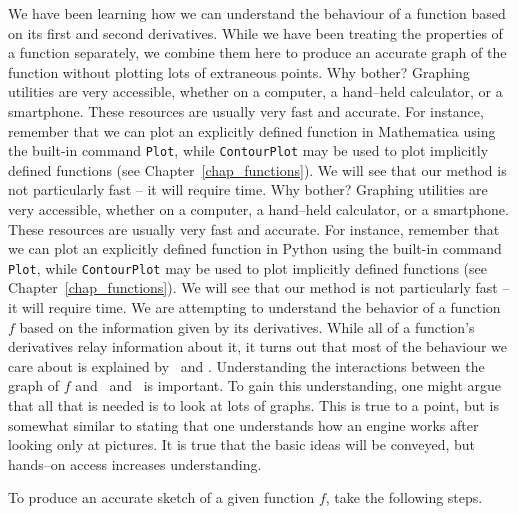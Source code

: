 We have been learning how we can understand the behaviour of a function based on its first and second derivatives. While we have been treating the properties of a function separately, we combine them here to produce an accurate graph of the function without plotting lots of extraneous points.
\ifmathematica
Why bother? Graphing utilities are very accessible, whether on a computer, a hand--held calculator, or a smartphone. These resources are usually very fast and accurate. For instance, remember that we can plot an explicitly defined function in Mathematica using the built-in command \lstinline{Plot}, while \lstinline{ContourPlot} may be used to plot implicitly defined functions (see Chapter~\ref{chap_functions}).   We will see that our method is not particularly fast -- it will require time. 
\fi
\ifpython
Why bother? Graphing utilities are very accessible, whether on a computer, a hand--held calculator, or a smartphone. These resources are usually very fast and accurate. For instance, remember that we can plot an explicitly defined function in Python using the built-in command \lstinline{Plot}, while \lstinline{ContourPlot} may be used to plot implicitly defined functions (see Chapter~\ref{chap_functions}).   We will see that our method is not particularly fast -- it will require time. 
\fi
We are attempting to understand the behavior of a function $f$ based on the information given by its derivatives. While all of a function's derivatives relay information about it, it turns out that most of the behaviour we care about is explained by \fp\ and \fpp. Understanding the interactions between the graph of $f$ and \fp\ and \fpp\ is important. To gain this understanding, one might argue that all that is needed is to look at lots of graphs. This is true to a point, but is somewhat similar to stating that one understands how an engine works after looking only at pictures. It is true that the basic ideas will be conveyed, but hands--on access increases understanding.

To produce an accurate sketch of a given function $f$, take  the following steps.

